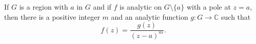 If $G$ is a region with $a$ in $G$ and if $f$ is analytic on $G \setminus \{a\}$ with a pole at $z = a$, then there is a positive integer $m$ and an analytic function $g: G \to \mathbb{C}$ such that
$$f(z) = \frac{g(z)}{(z-a)^m}.$$
